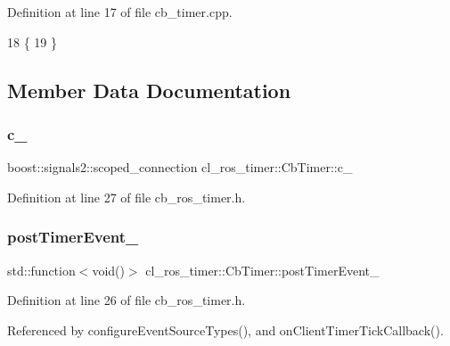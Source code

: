 Definition at line 17 of file cb\+\_\+timer.\+cpp.


\begin{DoxyCode}
18 \{
19 \}
\end{DoxyCode}


\subsection{Member Data Documentation}
\mbox{\label{classcl__ros__timer_1_1CbTimer_a2713f692e11ee82ea55080938d339881}} 
\subsubsection{\texorpdfstring{c\+\_\+}{c\_}}
{\footnotesize\ttfamily boost\+::signals2\+::scoped\+\_\+connection cl\+\_\+ros\+\_\+timer\+::\+Cb\+Timer\+::c\+\_\+\hspace{0.3cm}{\ttfamily [private]}}



Definition at line 27 of file cb\+\_\+ros\+\_\+timer.\+h.

\mbox{\label{classcl__ros__timer_1_1CbTimer_ad2b7913a84459d635fdcca8d346c7af2}} 
\subsubsection{\texorpdfstring{post\+Timer\+Event\+\_\+}{postTimerEvent\_}}
{\footnotesize\ttfamily std\+::function$<$void()$>$ cl\+\_\+ros\+\_\+timer\+::\+Cb\+Timer\+::post\+Timer\+Event\+\_\+\hspace{0.3cm}{\ttfamily [private]}}



Definition at line 26 of file cb\+\_\+ros\+\_\+timer.\+h.



Referenced by configure\+Event\+Source\+Types(), and on\+Client\+Timer\+Tick\+Callback().

